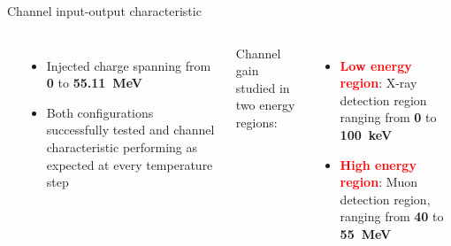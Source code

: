 \documentclass[aspectratio=169,xcolor=dvipsnames,handout]{beamer} %
\newcommand{\greencheck}{{\color{ForestGreen}\checkmark}}
\begin{document}
\begin{frame}{Channel input-output characteristic}
\begin{columns}
\begin{center}
            \end{center}    
            \vskip-0.2cm
            \begin{itemize}
                \item Injected charge spanning from \textbf{0} to \textbf{\SI{55.11}{\mega\electronvolt}} \greencheck
                \item Both configurations successfully tested and channel characteristic performing as expected at every temperature step \greencheck
            \end{itemize}
            \vskip0.3cm
            Channel gain studied in two energy regions:
            \begin{itemize}
                \item \textbf{\textcolor{Red}{Low energy region}}: X-ray detection region ranging from \textbf{0} to \textbf{\SI{100}{\kilo\electronvolt}}
                \item \textbf{\textcolor{Red}{High energy region}}: Muon detection region, ranging from \textbf{40} to \textbf{\SI{55}{\mega\electronvolt}}
            \end{itemize}
            \vspace{0.4cm}
    \end{columns}
\end{frame}


\end{document}
